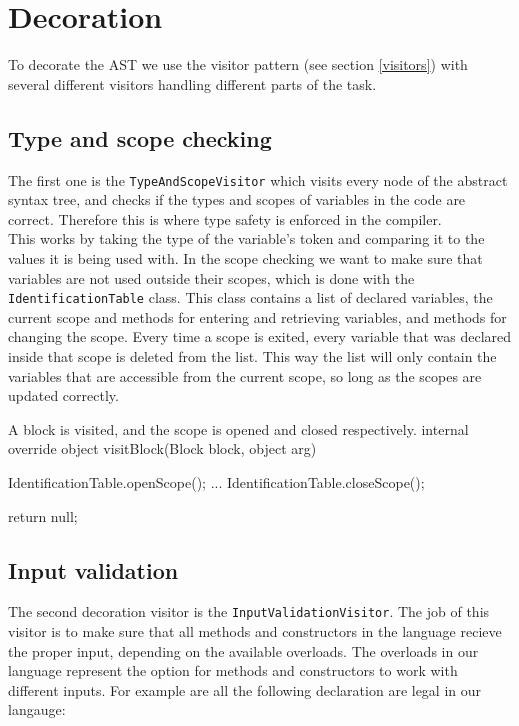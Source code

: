 \section{Decoration}
To decorate the AST we use the visitor pattern (see section \ref{visitors}) with several different visitors handling different parts of the task. \newline

\subsection{Type and scope checking}
The first one is the \texttt{TypeAndScopeVisitor} which visits every node of the abstract syntax tree, and checks if the types and scopes of variables in the code are correct. Therefore this is where type safety is enforced in the compiler.\\
This works by taking the type of the variable's token and comparing it to the values it is being used with. \newline
In the scope checking we want to make sure that variables are not used outside their scopes, which is done with the \texttt{IdentificationTable} class. 
This class contains a list of declared variables, the current scope and methods for entering and retrieving variables, and methods for changing the scope.\newline
Every time a scope is exited, every variable that was declared inside that scope is deleted from the list.
This way the list will only contain the variables that are accessible from the current scope, so long as the scopes are updated correctly.

\begin{source}{A block is visited, and the scope is opened and closed respectively.}{}
internal override object visitBlock(Block block, object arg)
		{
        IdentificationTable.openScope();
        ...
        IdentificationTable.closeScope();

        return null;
     }
\end{source}

\subsection{Input validation}
\label{inputvalidation}
The second decoration visitor is the \texttt{InputValidationVisitor}. 
The job of this visitor is to make sure that all methods and constructors in the language recieve the proper input, depending on the available overloads. 
The overloads in our language represent the option for methods and constructors to work with different inputs.
For example are all the following declaration are legal in our langauge:

